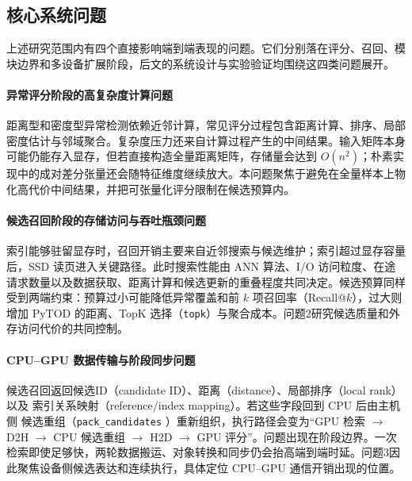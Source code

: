 \FloatBarrier

\subsection{核心系统问题}

上述研究范围内有四个直接影响端到端表现的问题。它们分别落在评分、召回、模块边界和多设备扩展阶段，后文的系统设计与实验验证均围绕这四类问题展开。

\paragraph{异常评分阶段的高复杂度计算问题}

距离型和密度型异常检测依赖近邻计算，常见评分过程包含距离计算、排序、局部密度估计与邻域聚合\citep{aggarwal2017outlier,zhao2022tod}。复杂度压力还来自计算过程产生的中间结果。输入矩阵本身可能仍能存入显存，但若直接构造全量距离矩阵，存储量会达到 $O(n^2)$；朴素实现中的成对差分张量还会随特征维度继续放大。本问题聚焦于避免在全量样本上物化高代价中间结果，并把可张量化评分限制在候选预算内。

\paragraph{候选召回阶段的存储访问与吞吐瓶颈问题}

索引能够驻留显存时，召回开销主要来自近邻搜索与候选维护；索引超过显存容量后，SSD 读页进入关键路径。此时搜索性能由 ANN 算法、I/O 访问粒度、在途请求数量以及数据获取、距离计算和候选更新的重叠程度共同决定。候选预算同样受到两端约束：预算过小可能降低异常覆盖和前 $k$ 项召回率（Recall@$k$），过大则增加 PyTOD 的距离、TopK 选择（\texttt{topk}）与聚合成本。问题2研究候选质量和外存访问代价的共同控制\citep{song2026vectoranns,xiao2025flashanns}。

\paragraph{CPU--GPU 数据传输与阶段同步问题}

候选召回返回候选ID（candidate ID）、距离（distance）、局部排序（local rank） 以及 索引关系映射（reference/index mapping）。若这些字段回到 CPU 后由主机侧 候选重组（\texttt{pack\_candidates} ）重新组织，执行路径会变为“GPU 检索 $\rightarrow$ D2H $\rightarrow$ CPU 候选重组 $\rightarrow$ H2D $\rightarrow$ GPU 评分”。问题出现在阶段边界。一次检索即使足够快，两轮数据搬运、对象转换和同步仍会抬高端到端时延。问题3因此聚焦设备侧候选表达和连续执行，具体定位 CPU--GPU 通信开销出现的位置\citep{pei2021gpudatabase,zhang2023gpuolap}。

